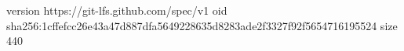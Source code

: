 version https://git-lfs.github.com/spec/v1
oid sha256:1cffefcc26e43a47d887dfa5649228635d8283ade2f3327f92f5654716195524
size 440
